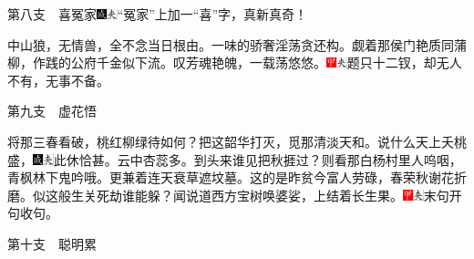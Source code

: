第八支　喜冤家{\includegraphics[width=3mm]{../Images/00005}\includegraphics[width=3mm]{../Images/00012}\footnotesize \kaishu “冤家”上加一“喜”字，真新真奇！}

中山狼，无情兽，全不念当日根由。一味的骄奢淫荡贪还构。觑着那侯门艳质同蒲柳，作践的公府千金似下流。叹芳魂艳魄，一载荡悠悠。{\includegraphics[width=3mm]{../Images/00002}\includegraphics[width=3mm]{../Images/00012}\footnotesize \kaishu 题只十二钗，却无人不有，无事不备。}

第九支　虚花悟

将那三春看破，桃红柳绿待如何？把这韶华打灭，觅那清淡天和。说什么天上夭桃盛，{\includegraphics[width=3mm]{../Images/00005}\includegraphics[width=3mm]{../Images/00012}\footnotesize \kaishu 此休恰甚。}云中杏蕊多。到头来谁见把秋捱过？则看那白杨村里人呜咽，青枫林下鬼吟哦。更兼着连天衰草遮坟墓。这的是昨贫今富人劳碌，春荣秋谢花折磨。似这般生关死劫谁能躲？闻说道西方宝树唤婆娑，上结着长生果。{\includegraphics[width=3mm]{../Images/00002}\includegraphics[width=3mm]{../Images/00012}\footnotesize \kaishu 末句开句收句。}

第十支　聪明累


